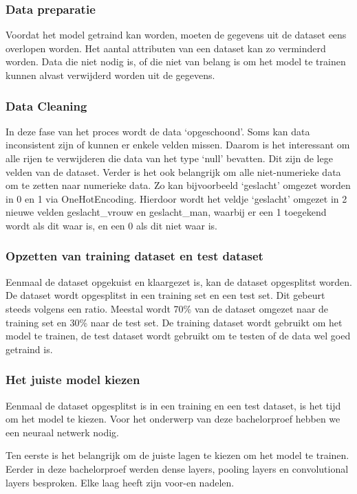 \subsubsection{Data preparatie}
\label{sec:datapreparatie}
Voordat het model getraind kan worden, moeten de gegevens uit de dataset eens overlopen worden. Het aantal attributen van een dataset kan zo verminderd worden. Data die niet nodig is, of die niet van belang is om het model te trainen kunnen alvast verwijderd worden uit de gegevens. 

\subsubsection{Data Cleaning}
\label{sec:datacleaning}
In deze fase van het proces wordt de data ‘opgeschoond’. Soms kan data inconsistent zijn of kunnen er enkele velden missen. Daarom is het interessant om alle rijen te verwijderen die data van het type ‘null’ bevatten. Dit zijn de lege velden van de dataset. Verder is het ook belangrijk om alle niet-numerieke data om te zetten naar numerieke data. Zo kan bijvoorbeeld ‘geslacht’ omgezet worden in 0 en 1 via \gls{OneHotEncoding}. Hierdoor wordt het veldje ‘geslacht’ omgezet in 2 nieuwe velden geslacht\_vrouw en geslacht\_man, waarbij er een 1 toegekend wordt als dit waar is, en een 0 als dit niet waar is. 

\subsubsection{Opzetten van training dataset en test dataset}
\label{sec:opzetten}
Eenmaal de dataset opgekuist en klaargezet is, kan de dataset opgesplitst worden. De dataset wordt opgesplitst in een training set en een test set. Dit gebeurt steeds volgens een ratio. Meestal wordt 70\% van de dataset omgezet naar de training set en 30\% naar de test set. De training dataset wordt gebruikt om het model te trainen, de test dataset wordt gebruikt om te testen of de data wel goed getraind is. 

\subsubsection{Het juiste model kiezen}
\label{sec:model}
Eenmaal de dataset opgesplitst is in een training en een test dataset, is het tijd om het model te kiezen. Voor het onderwerp van deze bachelorproef hebben we een neuraal netwerk nodig. 

Ten eerste is het belangrijk om de juiste lagen te kiezen om het model te trainen. Eerder in deze bachelorproef werden dense layers, pooling layers en convolutional layers besproken. Elke laag heeft zijn voor-en nadelen. 

